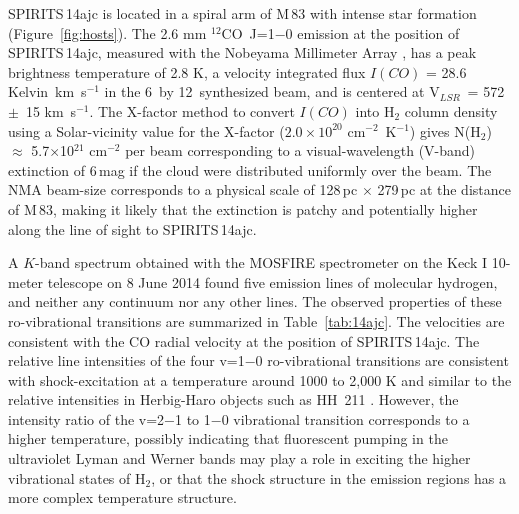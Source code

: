 \documentclass[twocolumn,times]{aastex6}
\newcommand{\kms}{km~s{$^{-1}$}}
\newcommand{\Vlsr}{V{$_{LSR}$}}
\newcommand{\Tco}{{$^{12}$CO}}
\begin{document}
SPIRITS\,14ajc is located in a spiral arm of M\,83 with intense star 
formation (Figure~\ref{fig:hosts}).    The  2.6 mm \Tco\  J=1$-$0
emission at the position of SPIRITS\,14ajc, 
measured  with the Nobeyama Millimeter Array \citep{Hirota2014}, 
has a  peak brightness temperature of  2.8 K,  a velocity integrated
flux $I(CO)$ = 28.6 Kelvin~km~s$^{-1}$ in the
6\arcsec\ by 12\arcsec\  synthesized beam, and is  centered at
\Vlsr\ = 572~$\pm$~15 \kms .  The X-factor method 
\citep{Bolatto2013} to convert  $I(CO)$ into H$_2$ column density  
using a Solar-vicinity value for the X-factor ($2.0 \times 10^{20}$ 
cm$^{-2}$~K$^{-1}$) gives  N(H$_{2}$) $\approx$ 5.7$\times$10$^{21}$ cm$^{-2}$ %
per beam  corresponding to a visual-wavelength (V-band)  extinction of 
6\,mag if the cloud were distributed  uniformly over the beam.
The NMA beam-size corresponds to a physical scale of 128\,pc $\times$ 279\,pc 
at the distance of M\,83, making it likely that the extinction
is patchy and potentially higher along the line of sight to SPIRITS\,14ajc.  

A  $K$-band spectrum obtained with the MOSFIRE spectrometer \citep{McLean2012} on the Keck I 
10-meter telescope on 8 June 2014 found  five  emission lines of 
molecular hydrogen, and neither any continuum nor any other lines.     
The observed properties of these ro-vibrational transitions 
are summarized in Table~\ref{tab:14ajc}.    The velocities are consistent with the CO  
radial velocity at the position of SPIRITS\,14ajc.    The relative line intensities  of the four v=1$-$0 
ro-vibrational transitions are consistent with shock-excitation at a temperature 
around 1000 to 2,000 K  and similar to the relative intensities in Herbig-Haro 
objects such as HH~211 \citep{OConnell2005}.  
However, the intensity ratio of the v=2$-$1 to 1$-$0  
vibrational  transition corresponds to a higher temperature, possibly indicating that
fluorescent pumping in the ultraviolet Lyman and Werner bands  
may play a role in exciting the higher vibrational states of H$_2$, or
 that the shock structure in the emission regions has a 
more complex temperature structure.    
\end{document}
